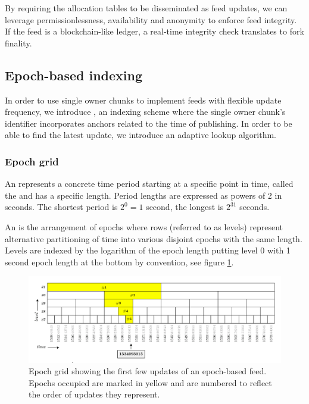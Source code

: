 By requiring the allocation tables to be disseminated as feed updates, we can leverage permissionlessness, availability and anonymity to enforce feed integrity. If the feed is a blockchain-like ledger, a real-time integrity check translates to fork finality. 


\subsection{Epoch-based 
indexing \statusyellow}\label{sec:epoch-based-feeds}

\yellow{}

In order to use single owner chunks to implement feeds with flexible update frequency, we introduce , an indexing scheme where the single owner chunk's identifier incorporates anchors related to the time of publishing. In order to be able to find the latest update, we introduce
an adaptive lookup algorithm. 

\subsubsection{Epoch grid}

An  represents a concrete time period starting at a specific point in time, called the  and has a specific length.  
Period lengths are expressed as powers of 2 in seconds. The shortest period is $2^0 = 1$ second, the longest is $2^{31}$ seconds. 

An  is the arrangement of epochs where rows (referred to as levels) represent alternative partitioning of time into various disjoint epochs with the same length. Levels are indexed by the logarithm of the epoch length putting level 0 with 1 second epoch length at the bottom by convention, see figure \ref{fig:epoch-grid}.

\begin{figure}[htbp]
\centering
\includegraphics[width=\textwidth]{fig/epoch-grid.pdf}
\caption[Epoch grid with epoch-based feed updates\statusorange]{Epoch grid showing the first few updates of an epoch-based feed. Epochs occupied are marked in yellow and are numbered to reflect the order of updates they represent. }
\label{fig:epoch-grid}
\end{figure}

